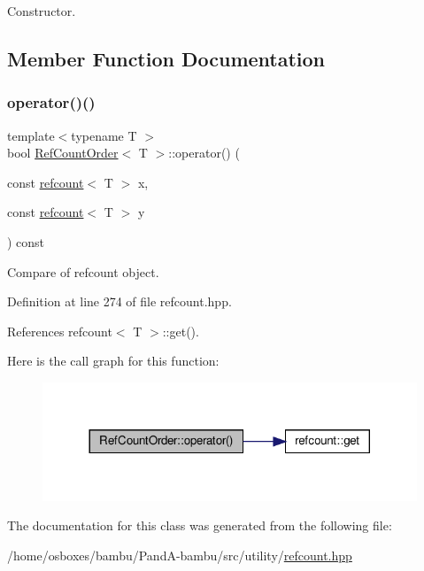 Constructor. 



\subsection{Member Function Documentation}
\mbox{\label{classRefCountOrder_ac1c51bb2fa7ad707aafbbd5dfb2fc6f7}} 
\subsubsection{\texorpdfstring{operator()()}{operator()()}}
{\footnotesize\ttfamily template$<$typename T $>$ \\
bool \hyperlink{classRefCountOrder}{Ref\+Count\+Order}$<$ T $>$\+::operator() (\begin{DoxyParamCaption}\item[{const \hyperlink{structrefcount}{refcount}$<$ T $>$}]{x,  }\item[{const \hyperlink{structrefcount}{refcount}$<$ T $>$}]{y }\end{DoxyParamCaption}) const\hspace{0.3cm}{\ttfamily [inline]}}



Compare of refcount object. 



Definition at line 274 of file refcount.\+hpp.



References refcount$<$ T $>$\+::get().

Here is the call graph for this function\+:
\nopagebreak
\begin{figure}[H]
\begin{center}
\leavevmode
\includegraphics[width=317pt]{d8/d6c/classRefCountOrder_ac1c51bb2fa7ad707aafbbd5dfb2fc6f7_cgraph}
\end{center}
\end{figure}


The documentation for this class was generated from the following file\+:\begin{DoxyCompactItemize}
\item 
/home/osboxes/bambu/\+Pand\+A-\/bambu/src/utility/\hyperlink{refcount_8hpp}{refcount.\+hpp}\end{DoxyCompactItemize}
